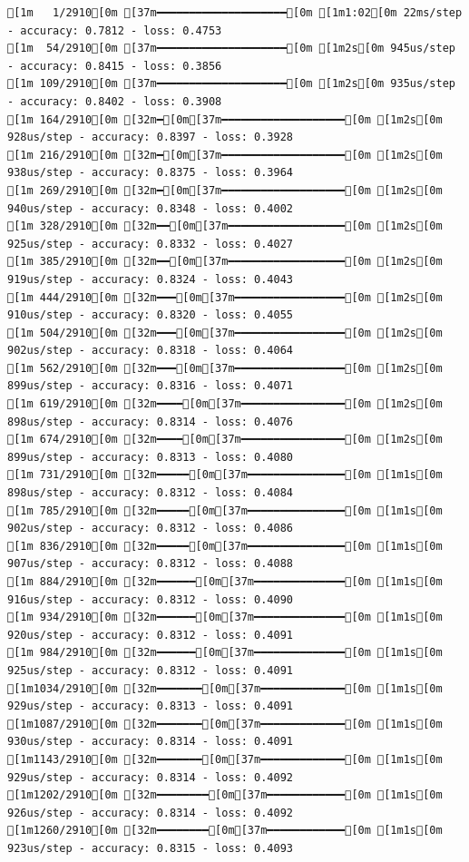 \documentclass[
  letterpaper,
  DIV=11,
  numbers=noendperiod]{scrartcl}
\begin{document}
\begin{verbatim}
[1m   1/2910[0m [37m━━━━━━━━━━━━━━━━━━━━[0m [1m1:02[0m 22ms/step - accuracy: 0.7812 - loss: 0.4753
[1m  54/2910[0m [37m━━━━━━━━━━━━━━━━━━━━[0m [1m2s[0m 945us/step - accuracy: 0.8415 - loss: 0.3856 
[1m 109/2910[0m [37m━━━━━━━━━━━━━━━━━━━━[0m [1m2s[0m 935us/step - accuracy: 0.8402 - loss: 0.3908
[1m 164/2910[0m [32m━[0m[37m━━━━━━━━━━━━━━━━━━━[0m [1m2s[0m 928us/step - accuracy: 0.8397 - loss: 0.3928
[1m 216/2910[0m [32m━[0m[37m━━━━━━━━━━━━━━━━━━━[0m [1m2s[0m 938us/step - accuracy: 0.8375 - loss: 0.3964
[1m 269/2910[0m [32m━[0m[37m━━━━━━━━━━━━━━━━━━━[0m [1m2s[0m 940us/step - accuracy: 0.8348 - loss: 0.4002
[1m 328/2910[0m [32m━━[0m[37m━━━━━━━━━━━━━━━━━━[0m [1m2s[0m 925us/step - accuracy: 0.8332 - loss: 0.4027
[1m 385/2910[0m [32m━━[0m[37m━━━━━━━━━━━━━━━━━━[0m [1m2s[0m 919us/step - accuracy: 0.8324 - loss: 0.4043
[1m 444/2910[0m [32m━━━[0m[37m━━━━━━━━━━━━━━━━━[0m [1m2s[0m 910us/step - accuracy: 0.8320 - loss: 0.4055
[1m 504/2910[0m [32m━━━[0m[37m━━━━━━━━━━━━━━━━━[0m [1m2s[0m 902us/step - accuracy: 0.8318 - loss: 0.4064
[1m 562/2910[0m [32m━━━[0m[37m━━━━━━━━━━━━━━━━━[0m [1m2s[0m 899us/step - accuracy: 0.8316 - loss: 0.4071
[1m 619/2910[0m [32m━━━━[0m[37m━━━━━━━━━━━━━━━━[0m [1m2s[0m 898us/step - accuracy: 0.8314 - loss: 0.4076
[1m 674/2910[0m [32m━━━━[0m[37m━━━━━━━━━━━━━━━━[0m [1m2s[0m 899us/step - accuracy: 0.8313 - loss: 0.4080
[1m 731/2910[0m [32m━━━━━[0m[37m━━━━━━━━━━━━━━━[0m [1m1s[0m 898us/step - accuracy: 0.8312 - loss: 0.4084
[1m 785/2910[0m [32m━━━━━[0m[37m━━━━━━━━━━━━━━━[0m [1m1s[0m 902us/step - accuracy: 0.8312 - loss: 0.4086
[1m 836/2910[0m [32m━━━━━[0m[37m━━━━━━━━━━━━━━━[0m [1m1s[0m 907us/step - accuracy: 0.8312 - loss: 0.4088
[1m 884/2910[0m [32m━━━━━━[0m[37m━━━━━━━━━━━━━━[0m [1m1s[0m 916us/step - accuracy: 0.8312 - loss: 0.4090
[1m 934/2910[0m [32m━━━━━━[0m[37m━━━━━━━━━━━━━━[0m [1m1s[0m 920us/step - accuracy: 0.8312 - loss: 0.4091
[1m 984/2910[0m [32m━━━━━━[0m[37m━━━━━━━━━━━━━━[0m [1m1s[0m 925us/step - accuracy: 0.8312 - loss: 0.4091
[1m1034/2910[0m [32m━━━━━━━[0m[37m━━━━━━━━━━━━━[0m [1m1s[0m 929us/step - accuracy: 0.8313 - loss: 0.4091
[1m1087/2910[0m [32m━━━━━━━[0m[37m━━━━━━━━━━━━━[0m [1m1s[0m 930us/step - accuracy: 0.8314 - loss: 0.4091
[1m1143/2910[0m [32m━━━━━━━[0m[37m━━━━━━━━━━━━━[0m [1m1s[0m 929us/step - accuracy: 0.8314 - loss: 0.4092
[1m1202/2910[0m [32m━━━━━━━━[0m[37m━━━━━━━━━━━━[0m [1m1s[0m 926us/step - accuracy: 0.8314 - loss: 0.4092
[1m1260/2910[0m [32m━━━━━━━━[0m[37m━━━━━━━━━━━━[0m [1m1s[0m 923us/step - accuracy: 0.8315 - loss: 0.4093

\end{verbatim}
\end{document}
